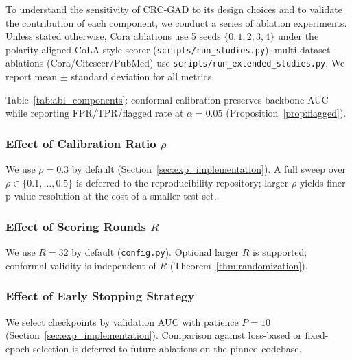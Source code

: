 \documentclass[a4paper]{cas-dc}
\theoremstyle{definition}
\begin{document}
To understand the sensitivity of CRC-GAD to its design choices and to validate the contribution of each component, we conduct a series of ablation experiments.  Unless stated otherwise, Cora ablations use 5 seeds $\{0,1,2,3,4\}$ under the polarity-aligned CoLA-style scorer (\texttt{scripts/run\_studies.py}); multi-dataset ablations (Cora/Citeseer/PubMed) use \texttt{scripts/run\_extended\_studies.py}.  We report mean $\pm$ standard deviation for all metrics.

\begin{table}[pos=t]
\centering
\caption{Ablation on Cora (mean $\pm$ std, 5 seeds; from \texttt{results/main\_results.csv}).}
\label{tab:abl_components}
\footnotesize

\end{table}

Table~\ref{tab:abl_components}: conformal calibration preserves backbone AUC while reporting FPR/TPR/flagged rate at $\alpha=0.05$ (Proposition~\ref{prop:flagged}).

\subsubsection{Effect of Calibration Ratio \texorpdfstring{$\rho$}{rho}}
\label{sec:abl_rho}

We use $\rho=0.3$ by default (Section~\ref{sec:exp_implementation}). A full sweep over $\rho \in \{0.1,\ldots,0.5\}$ is deferred to the reproducibility repository; larger $\rho$ yields finer p-value resolution at the cost of a smaller test set.

\subsubsection{Effect of Scoring Rounds \texorpdfstring{$R$}{R}}
\label{sec:abl_rounds}

We use $R=32$ by default (\texttt{config.py}). Optional larger $R$ is supported; conformal validity is independent of $R$ (Theorem~\ref{thm:randomization}).

\subsubsection{Effect of Early Stopping Strategy}
\label{sec:abl_earlystop}

We select checkpoints by validation AUC with patience $P=10$ (Section~\ref{sec:exp_implementation}). Comparison against loss-based or fixed-epoch selection is deferred to future ablations on the pinned codebase.
\end{document}
